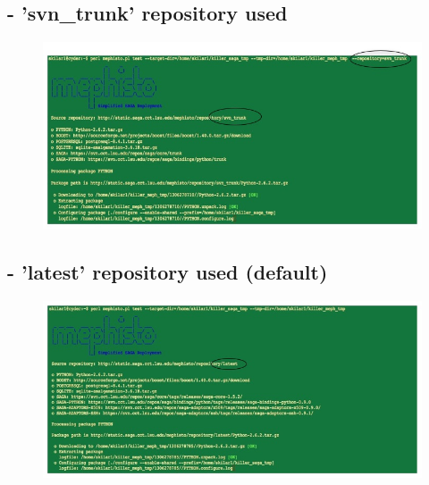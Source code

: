 \documentclass[a4paper,10pt]{article}
\begin{document}
\subsection*{- 'svn\_trunk' repository used}
\begin{figure}[H]
\begin{center}
\includegraphics[scale=0.60]{svntrunk.jpg}
\end{center}
\end{figure}
\subsection*{- 'latest' repository used (default)}
\begin{figure}[H]
\begin{center}
\includegraphics[scale=0.60]{latest.jpg}
\end{center}
\end{figure}
\end{document}

